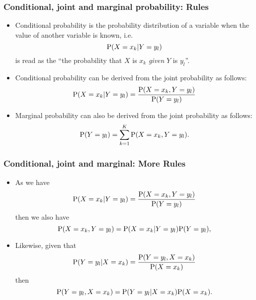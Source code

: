 \documentclass[10pt,xcolor=dvipsnames,serif,professionalfont]{beamer} %
\begin{document}
\begin{frame}
\frametitle{Conditional, joint and marginal probability: Rules}
\begin{itemize}
\item Conditional probability is the probability distribution of a variable when the value of another variable is known, i.e. 
\begin{equation*}
\mathrm{P}( X=x_k \vert Y=y_l  ) 
\end{equation*}
is read as the ``the probability that $X$ is $x_k$ \emph{given} $Y$ is $y_l$''.
\item Conditional probability can be derived from the joint probability as follows:
\begin{equation*}
\mathrm{P}( X=x_k \vert Y=y_l  ) = \frac{\mathrm{P}( X=x_k, Y=y_l  )}{ \mathrm{P}( Y=y_l  ) }
\end{equation*}
\item Marginal probability can also be derived from the joint probability as follows:
\begin{equation*}
\mathrm{P}( Y=y_l ) = \sum_{k=1}^K \mathrm{P}( X=x_k, Y=y_l  ).
\end{equation*}
\end{itemize}
\end{frame}

\begin{frame}
\frametitle{Conditional, joint and marginal: More Rules}
\begin{itemize}
\item As we have
\begin{equation*}
\mathrm{P}( X=x_k \vert Y=y_l  ) = \frac{\mathrm{P}( X=x_k, Y=y_l  )}{ \mathrm{P}( Y=y_l  ) }
\end{equation*}
then we also have 
\begin{equation*}
\mathrm{P}( X=x_k,Y=y_l ) = \mathrm{P}( X=x_k\vert Y=y_l )\mathrm{P}( Y=y_l ),
\end{equation*}
\item Likewise, given that
\begin{equation*}
\mathrm{P}( Y=y_l \vert X=x_k ) = \frac{\mathrm{P}( Y=y_l,X=x_k )}{\mathrm{P}( X=x_k )}
\end{equation*}
then 
\begin{equation*}
\mathrm{P}( Y=y_l,X=x_k ) = \mathrm{P}( Y=y_l \vert X=x_k )\mathrm{P}( X=x_k ).
\end{equation*}
\end{itemize}
\end{frame}
\end{document}
